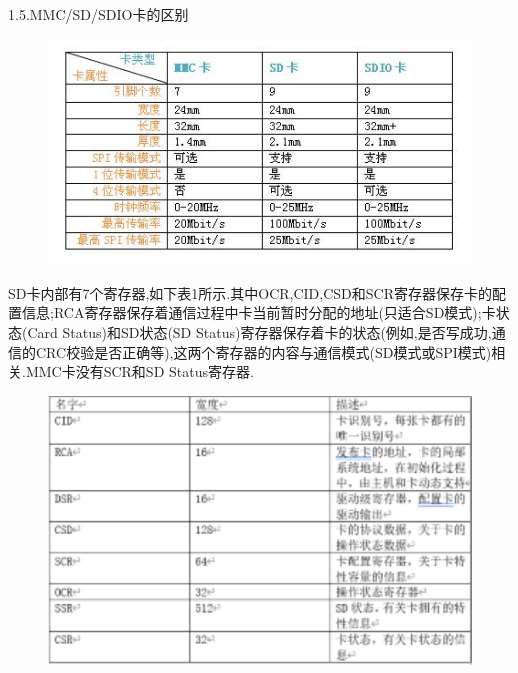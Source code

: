 1.5.MMC/SD/SDIO卡的区别
\begin{figure}[H]
    \centering
    \includegraphics{figures/06-02-区别.png}
\end{figure}

SD卡内部有7个寄存器,如下表1所示.其中OCR,CID,CSD和SCR寄存器保存卡的配置信息;RCA寄存器保存着通信过程中卡当前暂时分配的地址(只适合SD模式);卡状态(Card Status)和SD状态(SD Status)寄存器保存着卡的状态(例如,是否写成功,通信的CRC校验是否正确等),这两个寄存器的内容与通信模式(SD模式或SPI模式)相关.MMC卡没有SCR和SD Status寄存器.
\begin{figure}[H]
    \centering
    \includegraphics{figures/06-02-寄存器表.png}
\end{figure}

